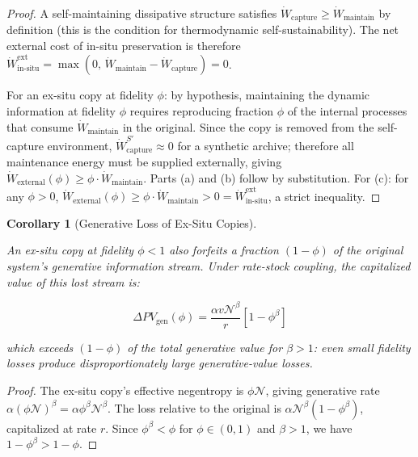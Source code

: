 \documentclass[11pt]{article}
\theoremstyle{plain}
\newtheorem{corollary}[theorem]{Corollary}
\theoremstyle{definition}
\theoremstyle{remark}
\begin{document}
\begin{proof}
A self-maintaining dissipative structure satisfies $\dot{W}_{\text{capture}} \geq \dot{W}_{\text{maintain}}$ by definition (this is the condition for thermodynamic self-sustainability). The net external cost of in-situ preservation is therefore $\dot{W}_{\text{in-situ}}^{\text{ext}} = \max(0,\, \dot{W}_{\text{maintain}} - \dot{W}_{\text{capture}}) = 0$.

For an ex-situ copy at fidelity $\phi$: by hypothesis, maintaining the dynamic information at fidelity $\phi$ requires reproducing fraction $\phi$ of the internal processes that consume $\dot{W}_{\text{maintain}}$ in the original. Since the copy is removed from the self-capture environment, $\dot{W}_{\text{capture}}^{S'} \approx 0$ for a synthetic archive; therefore all maintenance energy must be supplied externally, giving $\dot{W}_{\text{external}}(\phi) \geq \phi \cdot \dot{W}_{\text{maintain}}$. Parts (a) and (b) follow by substitution. For (c): for any $\phi > 0$, $\dot{W}_{\text{external}}(\phi) \geq \phi \cdot \dot{W}_{\text{maintain}} > 0 = \dot{W}_{\text{in-situ}}^{\text{ext}}$, a strict inequality.
\end{proof}

\begin{corollary}[Generative Loss of Ex-Situ Copies]
\label{cor-generative-loss-ex-situ}

An ex-situ copy at fidelity $\phi < 1$ also forfeits a fraction $(1 - \phi)$ of the original system's generative information stream. Under rate-stock coupling, the capitalized value of this lost stream is:

$$\Delta PV_{\text{gen}}(\phi) = \frac{\alpha v \mathcal{N}^\beta}{r}[1 - \phi^\beta]$$

which exceeds $(1-\phi)$ of the total generative value for $\beta > 1$: even small fidelity losses produce disproportionately large generative-value losses.
\end{corollary}

\begin{proof}
The ex-situ copy's effective negentropy is $\phi \mathcal{N}$, giving generative rate $\alpha(\phi\mathcal{N})^\beta = \alpha\phi^\beta\mathcal{N}^\beta$. The loss relative to the original is $\alpha\mathcal{N}^\beta(1 - \phi^\beta)$, capitalized at rate $r$. Since $\phi^\beta < \phi$ for $\phi \in (0,1)$ and $\beta > 1$, we have $1 - \phi^\beta > 1 - \phi$.
\end{proof}
\end{document}
